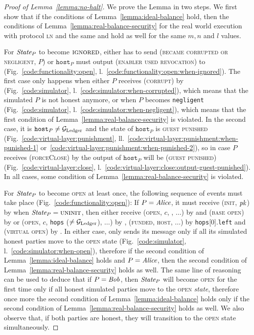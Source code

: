 \begin{proof}[Proof of Lemma~\ref{lemma:no-halt}]
  We prove the Lemma in two steps. We first show that if the conditions of
  Lemma~\ref{lemma:ideal-balance} hold, then the conditions of
  Lemma~\ref{lemma:real-balance-security} for the real world execution with
  protocol \textsc{ln} and the same \environment and \adversary hold as well for
  the same $m, n$ and $l$ values.

  For $\itistate_P$ to become $\textsc{ignored}$, either \simulator has to send
  (\textsc{became corrupted or negligent}, $P$) or $\texttt{host}_P$ must output
  (\textsc{enabler used revocation}) to \fchan
  (Fig.~\ref{code:functionality:open},
  l.~\ref{code:functionality:open:when-ignored}). The first case only happens
  when either $P$ receives (\textsc{corrupt}) by \adversary
  (Fig.~\ref{code:simulator}, l.~\ref{code:simulator:when-corrupted}), which
  means that the simulated $P$ is not honest anymore, or when $P$ becomes
  \texttt{negligent} (Fig.~\ref{code:simulator},
  l.~\ref{code:simulator:when-negligent}), which means that the first condition
  of Lemma~\ref{lemma:real-balance-security} is violated. In the second case, it
  is $\texttt{host}_P \neq \mathcal{G}_{\mathrm{Ledger}}$ and the state of $\texttt{host}_P$ is
  \textsc{guest punished} (Fig.~\ref{code:virtual-layer:punishment},
  ll.~\ref{code:virtual-layer:punishment:when-punished-1}
  or~\ref{code:virtual-layer:punishment:when-punished-2}), so in case $P$ receives
  (\textsc{forceClose}) by \environment the output of $\texttt{host}_P$ will be
  (\textsc{guest punished}) (Fig.~\ref{code:virtual-layer:close},
  l.~\ref{code:virtual-layer:close:output-guest-punished}). In all cases, some
  condition of Lemma~\ref{lemma:real-balance-security} is violated.

  For $\itistate_P$ to become \textsc{open} at least once, the following
  sequence of events must take place (Fig.~\ref{code:functionality:open}): If $P
  = \mathit{Alice}$, it must receive (\textsc{init}, $\textit{pk}_{}$) by \environment when
  $\itistate_P = \textsc{uninit}$, then either receive (\textsc{open}, $c$,
  \ledger, $\dots$) by \environment and (\textsc{base open}) by \simulator or
  (\textsc{open}, $c$, \texttt{hops} ($\neq \mathcal{G}_{\mathrm{Ledger}}$), $\dots$) by \environment,
  (\textsc{funded}, \textsc{host}, $\dots$) by \texttt{hops}[0].\texttt{left}
  and (\textsc{virtual open}) by \simulator. In either case, \simulator only
  sends its message only if all its simulated honest parties move to the
  \textsc{open} state (Fig.~\ref{code:simulator},
  l.~\ref{code:simulator:when-open}), therefore if the second condition of
  Lemma~\ref{lemma:ideal-balance} holds and $P = \mathit{Alice}$, then the second
  condition of Lemma~\ref{lemma:real-balance-security} holds as well. The same
  line of reasoning can be used to deduce that if $P = \mathit{Bob}$, then $\itistate_P$
  will become \textsc{open} for the first time only if all honest simulated
  parties move to the \textsc{open} \textit{state}, therefore once more the
  second condition of Lemma~\ref{lemma:ideal-balance} holds only if the second
  condition of Lemma~\ref{lemma:real-balance-security} holds as well. We also
  observe that, if both parties are honest, they will transition to the
  \textsc{open} state simultaneously.


\end{proof}
